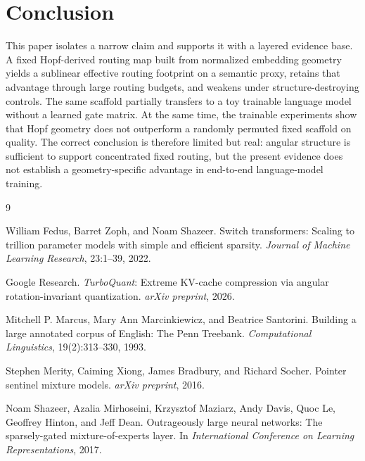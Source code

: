 \documentclass[11pt,letterpaper]{article}
\begin{document}
\section{Conclusion}
This paper isolates a narrow claim and supports it with a layered evidence base. A fixed Hopf-derived routing map built from normalized embedding geometry yields a sublinear effective routing footprint on a semantic proxy, retains that advantage through large routing budgets, and weakens under structure-destroying controls. The same scaffold partially transfers to a toy trainable language model without a learned gate matrix. At the same time, the trainable experiments show that Hopf geometry does not outperform a randomly permuted fixed scaffold on quality. The correct conclusion is therefore limited but real: angular structure is sufficient to support concentrated fixed routing, but the present evidence does not establish a geometry-specific advantage in end-to-end language-model training.

\begin{thebibliography}{9}

William Fedus, Barret Zoph, and Noam Shazeer.
\newblock Switch transformers: Scaling to trillion parameter models with simple and efficient sparsity.
\newblock \emph{Journal of Machine Learning Research}, 23:1--39, 2022.

Google Research.
\newblock \emph{TurboQuant}: Extreme {KV}-cache compression via angular rotation-invariant quantization.
\newblock \emph{arXiv preprint}, 2026.

Mitchell P. Marcus, Mary Ann Marcinkiewicz, and Beatrice Santorini.
\newblock Building a large annotated corpus of {E}nglish: The {Penn Treebank}.
\newblock \emph{Computational Linguistics}, 19(2):313--330, 1993.

Stephen Merity, Caiming Xiong, James Bradbury, and Richard Socher.
\newblock Pointer sentinel mixture models.
\newblock \emph{arXiv preprint}, 2016.

Noam Shazeer, Azalia Mirhoseini, Krzysztof Maziarz, Andy Davis, Quoc Le, Geoffrey Hinton, and Jeff Dean.
\newblock Outrageously large neural networks: The sparsely-gated mixture-of-experts layer.
\newblock In \emph{International Conference on Learning Representations}, 2017.

\end{thebibliography}
\end{document}
